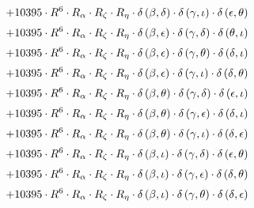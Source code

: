 \begin{subequations}
\begin{gather}
 \\[0.2em] \notag 		 + 10395 \cdot R^{6} \cdot R_{\alpha{}} \cdot R_{\zeta{}} \cdot R_{\eta{}} \cdot \delta{}\left(\beta{}, \delta{}\right) \cdot \delta{}\left(\gamma{}, \iota{}\right) \cdot \delta{}\left(\epsilon{}, \theta{}\right) 
 \\[0.2em] \notag 		 + 10395 \cdot R^{6} \cdot R_{\alpha{}} \cdot R_{\zeta{}} \cdot R_{\eta{}} \cdot \delta{}\left(\beta{}, \epsilon{}\right) \cdot \delta{}\left(\gamma{}, \delta{}\right) \cdot \delta{}\left(\theta{}, \iota{}\right) 
 \\[0.2em] \notag 		 + 10395 \cdot R^{6} \cdot R_{\alpha{}} \cdot R_{\zeta{}} \cdot R_{\eta{}} \cdot \delta{}\left(\beta{}, \epsilon{}\right) \cdot \delta{}\left(\gamma{}, \theta{}\right) \cdot \delta{}\left(\delta{}, \iota{}\right) 
 \\[0.2em] \notag 		 + 10395 \cdot R^{6} \cdot R_{\alpha{}} \cdot R_{\zeta{}} \cdot R_{\eta{}} \cdot \delta{}\left(\beta{}, \epsilon{}\right) \cdot \delta{}\left(\gamma{}, \iota{}\right) \cdot \delta{}\left(\delta{}, \theta{}\right) 
 \\[0.2em] \notag 		 + 10395 \cdot R^{6} \cdot R_{\alpha{}} \cdot R_{\zeta{}} \cdot R_{\eta{}} \cdot \delta{}\left(\beta{}, \theta{}\right) \cdot \delta{}\left(\gamma{}, \delta{}\right) \cdot \delta{}\left(\epsilon{}, \iota{}\right) 
 \\[0.2em] \notag 		 + 10395 \cdot R^{6} \cdot R_{\alpha{}} \cdot R_{\zeta{}} \cdot R_{\eta{}} \cdot \delta{}\left(\beta{}, \theta{}\right) \cdot \delta{}\left(\gamma{}, \epsilon{}\right) \cdot \delta{}\left(\delta{}, \iota{}\right) 
 \\[0.2em] \notag 		 + 10395 \cdot R^{6} \cdot R_{\alpha{}} \cdot R_{\zeta{}} \cdot R_{\eta{}} \cdot \delta{}\left(\beta{}, \theta{}\right) \cdot \delta{}\left(\gamma{}, \iota{}\right) \cdot \delta{}\left(\delta{}, \epsilon{}\right) 
 \\[0.2em] \notag 		 + 10395 \cdot R^{6} \cdot R_{\alpha{}} \cdot R_{\zeta{}} \cdot R_{\eta{}} \cdot \delta{}\left(\beta{}, \iota{}\right) \cdot \delta{}\left(\gamma{}, \delta{}\right) \cdot \delta{}\left(\epsilon{}, \theta{}\right) 
 \\[0.2em] \notag 		 + 10395 \cdot R^{6} \cdot R_{\alpha{}} \cdot R_{\zeta{}} \cdot R_{\eta{}} \cdot \delta{}\left(\beta{}, \iota{}\right) \cdot \delta{}\left(\gamma{}, \epsilon{}\right) \cdot \delta{}\left(\delta{}, \theta{}\right) 
 \\[0.2em] \notag 		 + 10395 \cdot R^{6} \cdot R_{\alpha{}} \cdot R_{\zeta{}} \cdot R_{\eta{}} \cdot \delta{}\left(\beta{}, \iota{}\right) \cdot \delta{}\left(\gamma{}, \theta{}\right) \cdot \delta{}\left(\delta{}, \epsilon{}\right) 

\end{gather}
\end{subequations}
